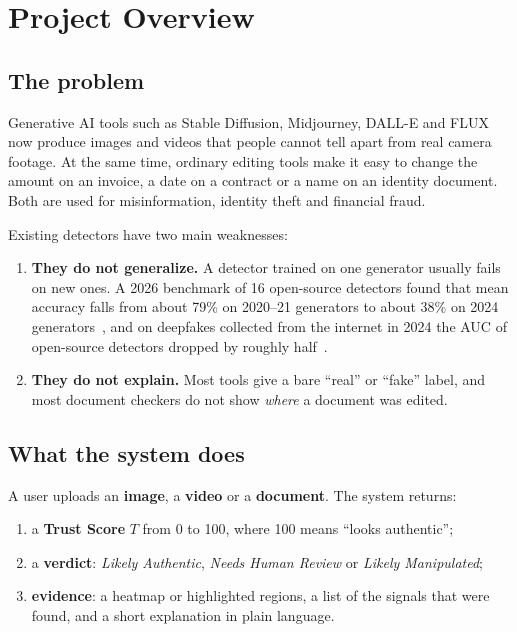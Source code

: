 \documentclass[11pt,a4paper]{article}
\begin{document}
\section{Project Overview}
\label{sec:overview}

\subsection{The problem}
Generative AI tools such as Stable Diffusion, Midjourney, DALL-E and FLUX now produce images
and videos that people cannot tell apart from real camera footage. At the same time, ordinary
editing tools make it easy to change the amount on an invoice, a date on a contract or a name
on an identity document. Both are used for misinformation, identity theft and financial fraud.

Existing detectors have two main weaknesses:
\begin{enumerate}
  \item \textbf{They do not generalize.} A detector trained on one generator usually fails on
        new ones. A 2026 benchmark of 16 open-source detectors found that mean accuracy falls
        from about 79\% on 2020--21 generators to about 38\% on 2024 generators~\cite{outofbox2026},
        and on deepfakes collected from the internet in 2024 the AUC of open-source detectors
        dropped by roughly half~\cite{deepfakeeval2024}.
  \item \textbf{They do not explain.} Most tools give a bare ``real'' or ``fake'' label, and most
        document checkers do not show \emph{where} a document was edited.
\end{enumerate}

\subsection{What the system does}
A user uploads an \textbf{image}, a \textbf{video} or a \textbf{document}. The system returns:
\begin{enumerate}
  \item a \textbf{Trust Score} $T$ from 0 to 100, where 100 means ``looks authentic'';
  \item a \textbf{verdict}: \emph{Likely Authentic}, \emph{Needs Human Review} or \emph{Likely Manipulated};
  \item \textbf{evidence}: a heatmap or highlighted regions, a list of the signals that were found,
        and a short explanation in plain language.
\end{enumerate}
\end{document}
